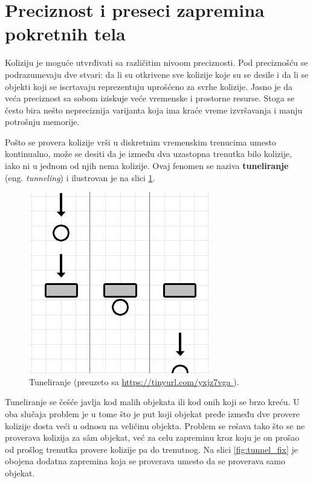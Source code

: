 \documentclass[12pt,oneside]{memoir}
\begin{document}
\section{Preciznost i preseci zapremina pokretnih tela}

Koliziju je moguće utvrđivati sa različitim nivoom preciznosti. 
Pod preciznošću se podrazumevaju dve stvari: da li su otkrivene sve kolizije koje su se desile i 
da li se objekti koji se iscrtavaju reprezentuju uprošćeno za svrhe kolizije. 
Jasno je da veća preciznost sa sobom iziskuje veće vremenske i prostorne resurse. 
Stoga se često bira nešto nepreciznija varijanta koja ima kraće vreme izvršavanja i manju potrošnju memorije.

Pošto se provera kolizije vrši u diskretnim vremenskim trenucima umesto kontinualno, može se desiti da 
je između dva uzastopna trenutka bilo kolizije, iako ni u jednom od njih nema kolizije. 
Ovaj fenomen se naziva \textbf{tuneliranje} (eng. {\em tunneling}) i ilustrovan je na slici \ref{fig:tunnel}. 

\begin{figure}[h!]
	\centering
	\includegraphics[scale=0.55]{tunnel.png}
	\caption{Tuneliranje (preuzeto sa \url{ https://tinyurl.com/yxjz7vga }).}
	
	\label{fig:tunnel}
\end{figure}

Tuneliranje se češće javlja kod malih objekata ili kod onih koji se brzo kreću.
U oba slučaja problem je u tome što je put koji objekat pređe između dve provere kolizije dosta veći u odnosu na veličinu objekta. 
Problem se rešava tako što se ne proverava kolizija za sâm objekat, već za celu zapreminu kroz koju je on prošao 
od prošlog trenutka provere kolizije pa do trenutnog. Na slici \ref{fig:tunnel_fix} je obojena dodatna zapremina 
koja se proverava umesto da se proverava samo objekat. 
\end{document}

